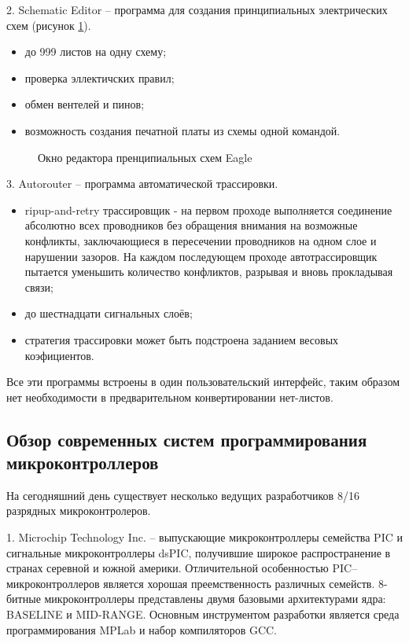\begin{par}
	2. Schematic Editor -- программа для создания принципиальных электрических схем (рисунок \ref{img:eagle_sch}).
		\begin{itemize}
			\item{}до 999 листов на одну схему;
			\item{}проверка эллектичских правил;
			\item{}обмен вентелей и пинов;
			\item{}возможность создания печатной платы из схемы одной командой.
		\end{itemize}
        \begin{figure}[ht]
            \caption{Окно редактора пренципиальных схем Eagle}
            \label{img:eagle_sch}
        \end{figure}
\end{par}

\begin{par}
	3. Autorouter -- программа автоматической трассировки.
		\begin{itemize}
			\item{}ripup-and-retry трассировщик - на первом проходе выполняется соединение абсолютно всех проводников без обращения внимания на возможные конфликты, заключающиеся в пересечении проводников на одном слое и нарушении зазоров. На каждом последующем проходе автотрассировщик пытается уменьшить количество конфликтов, разрывая и вновь прокладывая связи;
			\item{}до шестнадцати сигнальных слоёв;
			\item{}стратегия трассировки может быть подстроена заданием весовых коэфициентов.
		\end{itemize}
\end{par}

Все эти программы встроены в один пользовательский интерфейс, таким образом нет необходимости в
предварительном конвертировании нет-листов.


\subsection{Обзор современных систем программирования микроконтроллеров}
На сегодняшний день существует несколько ведущих разработчиков 8/16 разрядных микроконтролеров.


\begin{par}
	1. Microchip Technology Inc. -- выпускающие микроконтроллеры семейства PIC и
		сигнальные микроконтроллеры dsPIC,
		получившие широкое распространение в странах серевной и южной америки.
		Отличительной особенностью PIC--микроконтроллеров является хорошая преемственность
		различных семейств.
		8-битные микроконтроллеры представлены двумя базовыми архитектурами ядра:
		BASELINE и MID-RANGE. Основным инструментом разработки является среда программирования
		MPLab и набор компиляторов GCC.
\end{par}


